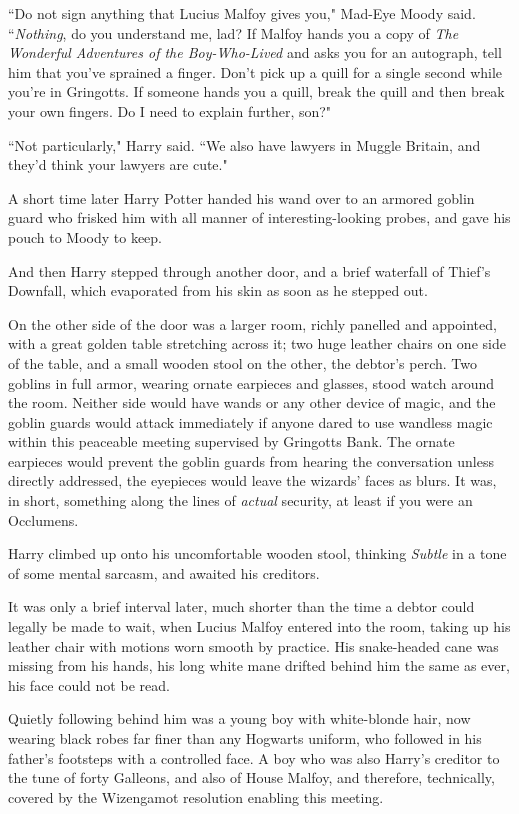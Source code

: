 ``Do not sign anything that Lucius Malfoy gives you," Mad-Eye Moody said. ``\emph{Nothing}, do you understand me, lad? If Malfoy hands you a copy of \emph{The Wonderful Adventures of the Boy-Who-Lived} and asks you for an autograph, tell him that you've sprained a finger. Don't pick up a quill for a single second while you're in Gringotts. If someone hands you a quill, break the quill and then break your own fingers. Do I need to explain further, son?"

``Not particularly," Harry said. ``We also have lawyers in Muggle Britain, and they'd think your lawyers are cute."

A short time later Harry Potter handed his wand over to an armored goblin guard who frisked him with all manner of interesting-looking probes, and gave his pouch to Moody to keep.

And then Harry stepped through another door, and a brief waterfall of Thief's Downfall, which evaporated from his skin as soon as he stepped out.

On the other side of the door was a larger room, richly panelled and appointed, with a great golden table stretching across it; two huge leather chairs on one side of the table, and a small wooden stool on the other, the debtor's perch. Two goblins in full armor, wearing ornate earpieces and glasses, stood watch around the room. Neither side would have wands or any other device of magic, and the goblin guards would attack immediately if anyone dared to use wandless magic within this peaceable meeting supervised by Gringotts Bank. The ornate earpieces would prevent the goblin guards from hearing the conversation unless directly addressed, the eyepieces would leave the wizards' faces as blurs. It was, in short, something along the lines of \emph{actual} security, at least if you were an Occlumens.

Harry climbed up onto his uncomfortable wooden stool, thinking \emph{Subtle} in a tone of some mental sarcasm, and awaited his creditors.

It was only a brief interval later, much shorter than the time a debtor could legally be made to wait, when Lucius Malfoy entered into the room, taking up his leather chair with motions worn smooth by practice. His snake-headed cane was missing from his hands, his long white mane drifted behind him the same as ever, his face could not be read.

Quietly following behind him was a young boy with white-blonde hair, now wearing black robes far finer than any Hogwarts uniform, who followed in his father's footsteps with a controlled face. A boy who was also Harry's creditor to the tune of forty Galleons, and also of House Malfoy, and therefore, technically, covered by the Wizengamot resolution enabling this meeting.

